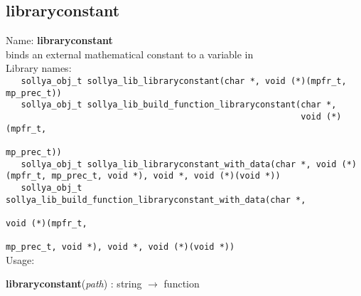 \subsection{libraryconstant}
\label{lablibraryconstant}
\noindent Name: \textbf{libraryconstant}\\
\phantom{aaa}binds an external mathematical constant to a variable in \sollya\\[0.2cm]
\noindent Library names:\\
\verb|   sollya_obj_t sollya_lib_libraryconstant(char *, void (*)(mpfr_t, mp_prec_t))|\\
\verb|   sollya_obj_t sollya_lib_build_function_libraryconstant(char *,|\\
\verb|                                                          void (*)(mpfr_t,|\\
\verb|                                                                   mp_prec_t))|\\
\verb|   sollya_obj_t sollya_lib_libraryconstant_with_data(char *, void (*)(mpfr_t, mp_prec_t, void *), void *, void (*)(void *))|\\
\verb|   sollya_obj_t sollya_lib_build_function_libraryconstant_with_data(char *,|\\
\verb|                                                                    void (*)(mpfr_t,|\\
\verb|                                                                    mp_prec_t, void *), void *, void (*)(void *))|\\[0.2cm]
\noindent Usage: 
\begin{center}
\textbf{libraryconstant}(\emph{path}) : \textsf{string} $\rightarrow$ \textsf{function}\\
\end{center}
